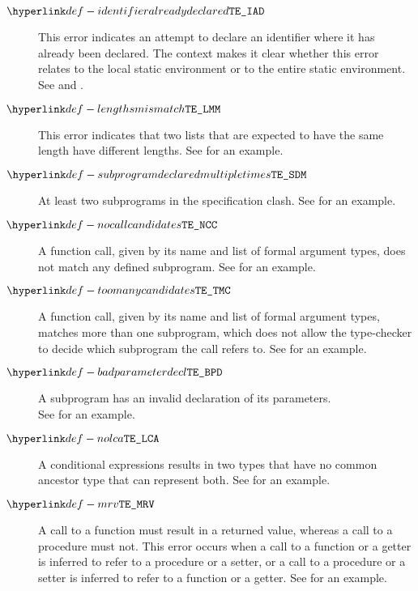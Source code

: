 \begin{description}
\hypertarget{def-identifieralreadydeclared}{}
\item[$\IdentifierAlreadyDeclared$]
This error indicates an attempt to declare an identifier where it has already been declared.
The context makes it clear whether this error relates to the local static environment or to the
entire static environment.
See  and .

\hypertarget{def-lengthsmismatch}{}
\item[$\LengthsMismatch$]
This error indicates that two lists that are expected to have the same length have different lengths.
See  for an example.

\hypertarget{def-subprogramdeclaredmultipletimes}{}
\item[$\SubrogramDeclaredMultipleTimes$]
At least two subprograms in the specification clash.
See  for an example.

\hypertarget{def-nocallcandidates}{}
\item[$\NoCallCandidates$]
A function call, given by its name and list of formal argument types, does not match any defined subprogram.
See  for an example.

\hypertarget{def-toomanycandidates}{}
\item[$\TooManyCandidates$]
A function call, given by its name and list of formal argument types, matches more than one subprogram,
which does not allow the type-checker to decide which subprogram the call refers to.
See  for an example.

\hypertarget{def-badparameterdecl}{}
\item[$\BadParameterDecl$]
A subprogram has an invalid declaration of its parameters.\\
See  for an example.

\hypertarget{def-nolca}{}
\item[$\NoLCA$]
A conditional expressions results in two types that have no common ancestor type that can represent both.
See  for an example.

\hypertarget{def-mrv}{}
\item[$\MismatchedReturnValue$]
A call to a function must result in a returned value,
whereas a call to a procedure must not.
This error occurs when a call to a function or a getter is inferred to refer to a procedure or a setter,
or a call to a procedure or a setter is inferred to refer to a function or a getter.
See  for an example.


\end{description}
